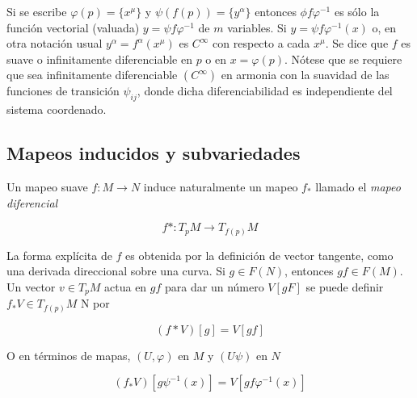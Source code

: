 \documentclass{report}
\begin{document}
Si se escribe $\varphi(p) = \lbrace x^{\mu} \rbrace$ y $\psi(f(p)) = \lbrace y^{\alpha} \rbrace$ entonces $\phi f \varphi ^{-1}$ es sólo la función vectorial (valuada) $y = \psi f \varphi ^{-1}$ de $m$ variables. Si $y = \psi f \varphi ^{-1} (x)$ o, en otra notación usual $y ^{\alpha} = f^{\alpha}(x^{\mu})$ es $C^{\infty}$ con respecto a cada $x^{\mu}$. Se dice que $f$ es suave o infinitamente diferenciable en $p$ o en $x = \varphi (p)$. Nótese que se requiere que sea infinitamente diferenciable $(C ^{\infty})$ en armonia con la suavidad de las funciones de transición $\psi _{ij}$, donde dicha diferenciabilidad es independiente del sistema coordenado.\\


\subsection{ Mapeos inducidos y subvariedades}

Un mapeo suave $f: M \rightarrow N$ induce naturalmente un mapeo $f_{*}$ llamado el \textit{mapeo diferencial}

\begin{equation}
f* : T_{p}M \rightarrow T_{f(p)}M
\end{equation}

La forma explícita de $f$ es obtenida por la definición de vector tangente, como una derivada direccional sobre una curva. Si $g \in F(N)$, entonces $gf \in F(M)$.\\

Un vector $v \in T_{p}M$ actua en $gf$ para dar un número $V[gF]$ se puede definir $f_{*}V \in T_{f(p)}M$ N por

\begin{equation}
(f* V)[g] = V[gf]
\end{equation}

O en términos de mapas, $(U, \varphi)$ en $M$ y $(U\psi)$ en $N$

\begin{equation}
(f_{*}V)[g\psi ^{-1} (x)] = V[gf \varphi ^{-1} (x)]
\end{equation}



\end{document}
